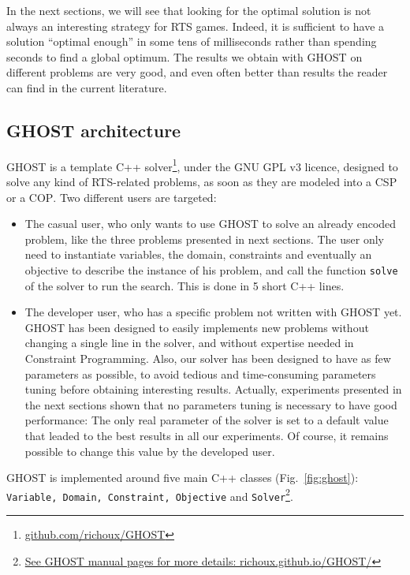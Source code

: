 \documentclass[journal]{IEEEtran}
\newcommand{\csp}{\textsc{CSP}\xspace}
\newcommand{\cop}{\textsc{COP}\xspace}
\newcommand{\ghost}{\textsc{GHOST}\xspace}
\begin{document}
In  the next  sections,  we  will see  that  looking  for the  optimal
solution is not always an  interesting strategy for RTS games. Indeed,
it is sufficient to have a solution ``optimal enough'' in some tens of
milliseconds   rather  than   spending  seconds   to  find   a  global
optimum. The results  we obtain with \ghost on  different problems are
very good, and  even often better than results the  reader can find in
the current literature.

\subsection{\ghost architecture}

\ghost             is            a             template            C++
solver\footnote{\href{https://github.com/richoux/GHOST}{github.com/richoux/GHOST}},
under  the  GNU  GPL  v3  licence,  designed  to  solve  any  kind  of
RTS-related problems,  as soon as  they are modeled  into a \csp  or a
\cop. Two different users are targeted:

\begin{itemize}
\item  The casual  user, who  only wants  to use  \ghost to  solve an
  already encoded problem,  like the three problems  presented in next
  sections.  The user only need  to instantiate variables, the domain,
  constraints and eventually an objective  to describe the instance of
  his problem, and  call the function \texttt{solve} of  the solver to
  run the  search. This is  done in 5 short  C++ lines.
\item The developer user, who has  a specific problem not written with
  \ghost  yet.  \ghost  has  been designed  to  easily implements  new
  problems without changing  a single line in the  solver, and without
  expertise needed  in Constraint  Programming.  Also, our  solver has
  been  designed to  have  as  few parameters  as  possible, to  avoid
  tedious  and  time-consuming   parameters  tuning  before  obtaining
  interesting results.   Actually, experiments  presented in  the next
  sections shown that  no parameters tuning is necessary  to have good
  performance:  The only  real parameter  of the  solver is  set to  a
  default  value  that   leaded  to  the  best  results   in  all  our
  experiments. Of course, it remains  possible to change this value by
  the developed user.
\end{itemize}

\ghost    is    implemented    around   five    main    C++    classes
(Fig.~\ref{fig:ghost}):    \texttt{Variable,    Domain,    Constraint,
  Objective}                                                       and
\texttt{Solver}\footnote{\href{http://richoux.github.io/GHOST/}{See
    \ghost manual pages for more details: richoux.github.io/GHOST/}}.
\end{document}
